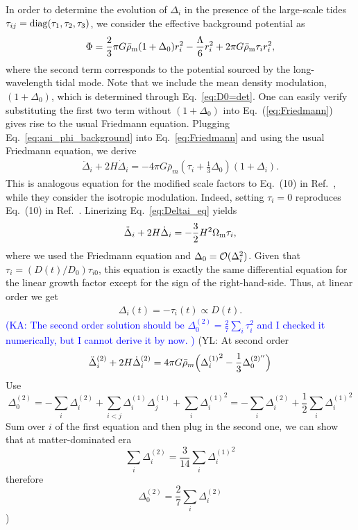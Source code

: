 \documentclass[a4paper,11pt]{article}
\newcommand{\YL}[1]{\textcolor{Bittersweet}{(YL: #1)}}
\newcommand{\KA}[1]{\textcolor{Blue}{(KA: #1)}}
\begin{document}
In order to determine the evolution of $\Delta_i$ in the presence of the large-scale tides $\tau_{ij}={\rm diag}(\tau_1,\tau_2,\tau_3)$,
we consider the effective background potential as
\begin{align}
    \Phi = \frac{2}{3}\pi G\bar{\rho}_{\rm m}(1+\Delta_0) r_i^2 - \frac{\Lambda}{6}r_i^2
            +2 \pi G\bar{\rho}_{\rm m}\tau_i r_i^2,
            \label{eq:ani_phi_background}
\end{align}
where the second term corresponds to the potential sourced by the long-wavelength tidal mode.
Note that we include the mean density modulation, $(1+\Delta_0)$,
which is determined through Eq.~\eqref{eq:D0=det}.
One can easily verify substituting the first two term without $(1+\Delta_0)$
into Eq.~(\ref{eq:Friedmann}) gives rise to the usual Friedmann equation.
Plugging Eq.~\eqref{eq:ani_phi_background} into Eq.~\eqref{eq:Friedmann}
and using the usual Friedmann equation,
we derive
\begin{align}
    \ddot \Delta_i + 2H\dot \Delta_i
    = -4\pi G \bar{\rho}_m\left(\tau_i + \frac{1}{3}\Delta_0\right) (1+\Delta_i).
    \label{eq:Deltai_eq}
\end{align}
This is analogous equation for the modified scale factors to Eq.~(10) in Ref.~\cite{Wagner_etal:2014},
while they consider the isotropic modulation.
Indeed, setting $\tau_i=0$ reproduces Eq.~(10) in Ref.~\cite{Wagner_etal:2014}.
Linerizing Eq.~\eqref{eq:Deltai_eq} yields
\begin{align}
 \ddot \Delta_i + 2H\dot \Delta_i
 = -\frac{3}{2}H^2\Omega_{\rm m}\tau_i,
\end{align}
where we used the Friedmann equation and $\Delta_0 = {\cal O}(\Delta_i^2)$.
Given that $\tau_i = (D(t)/D_0)\tau_{i0}$,
this equation is exactly the same differential equation for the linear growth factor
except for the sign of the right-hand-side.
Thus, at linear order we get
\begin{align}
\Delta_i(t) = -\tau_i(t) \propto D(t).
\end{align}
\KA{
The second order solution should be $\Delta^{(2)}_0 = \frac{2}{7}\sum_i\tau_i^2$ and I checked it numerically, but I cannot derive it by now.
}
\YL{
At second order
\begin{equation}
    \ddot\Delta_i^{(2)} + 2H \dot\Delta_i^{(2)}
    = 4\pi G \bar\rho_m \Bigl( {\Delta_i^{(1)}}^2 - \frac13 \Delta_0^{(2)''} \Bigr)
\end{equation}
Use
\begin{equation}
    \Delta_0^{(2)} = - \sum_i \Delta_i^{(2)}
    + \sum_{i<j} \Delta_i^{(1)} \Delta_j^{(1)} + \sum_i {\Delta_i^{(1)}}^2
    = - \sum_i \Delta_i^{(2)} + \frac12 \sum_i {\Delta_i^{(1)}}^2
\end{equation}
Sum over $i$ of the first equation and then plug in the second one, we can show that
at matter-dominated era
\begin{equation}
    \sum_i \Delta_i^{(2)} = \frac3{14} \sum_i {\Delta_i^{(1)}}^2
\end{equation}
therefore
\begin{equation}
    \Delta_0^{(2)} = \frac27 \sum_i \Delta_i^{(2)}
\end{equation}
}
\end{document}
